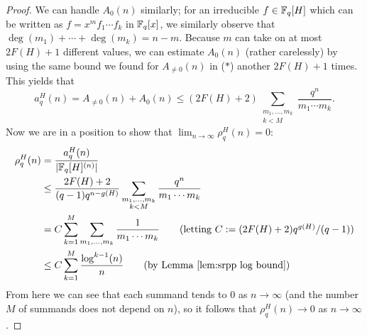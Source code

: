 \begin{proof}
	We can handle $A_0(n)$ similarly; for an irreducible $f\in \mathbb{F}_q[H]$ which can be written as $f= x^m f_1\cdots f_k$ in $\mathbb{F}_q[x]$, we similarly observe that $\deg(m_1)+\cdots+\deg(m_k) = n-m$. 
	Because $m$ can take on at most $2F(H)+1$ different values, we can estimate $A_0(n)$ (rather carelessly) by using the same bound we found for $A_{\neq0}(n)$ in ($*$) another $2F(H)+1$ times.
	This yields that
	\[a_q^H(n) = A_{\neq0}(n) + A_0(n) \le (2F(H)+2) \sum_{\substack{m_1,\dots,m_k \\ k < M}} \frac{q^n}{m_1\cdots m_k}. \]
	Now we are in a position to show that $\lim_{n\to\infty}\rho_q^H(n) = 0$:
	\begin{align*}
	\rho_q^H(n) 
	&= \frac{a_q^H(n)}{|\Fq[H]^{(n)}|} \\
	&\le \frac{2F(H)+2}{(q-1)q^{n-g(H)}} \sum_{\substack{m_1,\dots,m_k \\ k<M}} \frac{q^n}{m_1\cdots m_k} \\
	&=C \sum_{k=1}^M \sum_{m_1,\dots,m_k} \frac{1}{m_1\cdots m_k} \tag{letting $C := (2F(H)+2)q^{g(H)}/(q-1)$}\\
	&\le C \sum_{k=1}^M \frac{\log^{k-1}(n)}{n} \tag{by Lemma \ref{lem:srpp log bound}} \\
	\end{align*}
	From here we can see that each summand tends to $0$ as $n\to\infty$ (and the number $M$ of summands does not depend on $n$), so it follows that $\rho_q^H(n) \to 0$ as $n\to \infty$.
\end{proof}